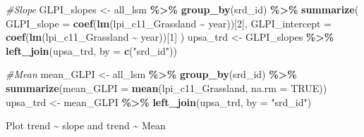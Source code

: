 \documentclass[
]{article}
\newenvironment{Shaded}{\begin{snugshade}}{\end{snugshade}}
\newcommand{\AttributeTok}[1]{\textcolor[rgb]{0.13,0.29,0.53}{#1}}
\newcommand{\CommentTok}[1]{\textcolor[rgb]{0.56,0.35,0.01}{\textit{#1}}}
\newcommand{\ConstantTok}[1]{\textcolor[rgb]{0.56,0.35,0.01}{#1}}
\newcommand{\DecValTok}[1]{\textcolor[rgb]{0.00,0.00,0.81}{#1}}
\newcommand{\FunctionTok}[1]{\textcolor[rgb]{0.13,0.29,0.53}{\textbf{#1}}}
\newcommand{\NormalTok}[1]{#1}
\newcommand{\OtherTok}[1]{\textcolor[rgb]{0.56,0.35,0.01}{#1}}
\newcommand{\SpecialCharTok}[1]{\textcolor[rgb]{0.81,0.36,0.00}{\textbf{#1}}}
\newcommand{\StringTok}[1]{\textcolor[rgb]{0.31,0.60,0.02}{#1}}
\begin{document}
\begin{Shaded}
\begin{Highlighting}[]
\CommentTok{\#Slope}
\NormalTok{GLPI\_slopes }\OtherTok{\textless{}{-}}\NormalTok{ all\_lsm }\SpecialCharTok{\%\textgreater{}\%}
  \FunctionTok{group\_by}\NormalTok{(srd\_id) }\SpecialCharTok{\%\textgreater{}\%}
  \FunctionTok{summarize}\NormalTok{(}
    \AttributeTok{GLPI\_slope =} \FunctionTok{coef}\NormalTok{(}\FunctionTok{lm}\NormalTok{(lpi\_c11\_Grassland }\SpecialCharTok{\textasciitilde{}}\NormalTok{ year))[}\DecValTok{2}\NormalTok{],  }
    \AttributeTok{GLPI\_intercept =} \FunctionTok{coef}\NormalTok{(}\FunctionTok{lm}\NormalTok{(lpi\_c11\_Grassland }\SpecialCharTok{\textasciitilde{}}\NormalTok{ year))[}\DecValTok{1}\NormalTok{] }
\NormalTok{  )}
\NormalTok{upsa\_trd }\OtherTok{\textless{}{-}}\NormalTok{ GLPI\_slopes }\SpecialCharTok{\%\textgreater{}\%}
  \FunctionTok{left\_join}\NormalTok{(upsa\_trd, }\AttributeTok{by =} \FunctionTok{c}\NormalTok{(}\StringTok{"srd\_id"}\NormalTok{))}

\CommentTok{\#Mean}
\NormalTok{mean\_GLPI }\OtherTok{\textless{}{-}}\NormalTok{ all\_lsm }\SpecialCharTok{\%\textgreater{}\%}
  \FunctionTok{group\_by}\NormalTok{(srd\_id) }\SpecialCharTok{\%\textgreater{}\%}
  \FunctionTok{summarize}\NormalTok{(}\AttributeTok{mean\_GLPI =} \FunctionTok{mean}\NormalTok{(lpi\_c11\_Grassland, }\AttributeTok{na.rm =} \ConstantTok{TRUE}\NormalTok{))}
\NormalTok{upsa\_trd }\OtherTok{\textless{}{-}}\NormalTok{ mean\_GLPI }\SpecialCharTok{\%\textgreater{}\%}
  \FunctionTok{left\_join}\NormalTok{(upsa\_trd, }\AttributeTok{by =} \StringTok{"srd\_id"}\NormalTok{)}
\end{Highlighting}
\end{Shaded}

Plot trend \textasciitilde{} slope and trend \textasciitilde{} Mean
\end{document}
